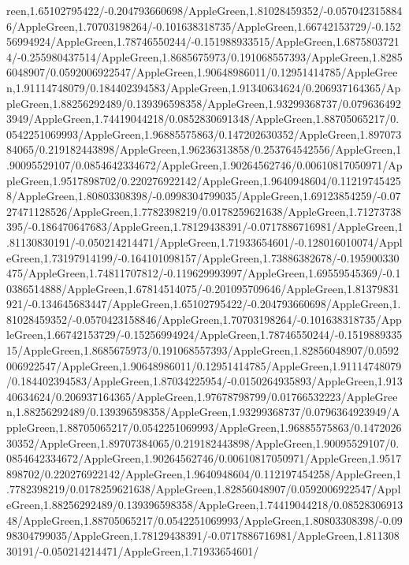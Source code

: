 {\begin{tikzternal}
{reen,1.65102795422/-0.204793660698/AppleGreen,1.81028459352/-0.0570423158846/AppleGreen,1.70703198264/-0.101638318735/AppleGreen,1.66742153729/-0.15256994924/AppleGreen,1.78746550244/-0.151988933515/AppleGreen,1.68758037214/-0.255980437514/AppleGreen,1.8685675973/0.191068557393/AppleGreen,1.82856048907/0.0592006922547/AppleGreen,1.90648986011/0.12951414785/AppleGreen,1.91114748079/0.184402394583/AppleGreen,1.91340634624/0.206937164365/AppleGreen,1.88256292489/0.139396598358/AppleGreen,1.93299368737/0.0796364923949/AppleGreen,1.74419044218/0.0852830691348/AppleGreen,1.88705065217/0.0542251069993/AppleGreen,1.96885575863/0.147202630352/AppleGreen,1.89707384065/0.219182443898/AppleGreen,1.96236313858/0.253764542556/AppleGreen,1.90095529107/0.0854642334672/AppleGreen,1.90264562746/0.00610817050971/AppleGreen,1.9517898702/0.220276922142/AppleGreen,1.9640948604/0.112197454258/AppleGreen,1.80803308398/-0.0998304799035/AppleGreen,1.69123854259/-0.0727471128526/AppleGreen,1.7782398219/0.0178259621638/AppleGreen,1.71273738395/-0.186470647683/AppleGreen,1.78129438391/-0.0717886716981/AppleGreen,1.81130830191/-0.050214214471/AppleGreen,1.71933654601/-0.128016010074/AppleGreen,1.73197914199/-0.164101098157/AppleGreen,1.73886382678/-0.195900330475/AppleGreen,1.74811707812/-0.119629993997/AppleGreen,1.69559545369/-0.10386514888/AppleGreen,1.67814514075/-0.201095709646/AppleGreen,1.81379831921/-0.134645683447/AppleGreen,1.65102795422/-0.204793660698/AppleGreen,1.81028459352/-0.0570423158846/AppleGreen,1.70703198264/-0.101638318735/AppleGreen,1.66742153729/-0.15256994924/AppleGreen,1.78746550244/-0.151988933515/AppleGreen,1.8685675973/0.191068557393/AppleGreen,1.82856048907/0.0592006922547/AppleGreen,1.90648986011/0.12951414785/AppleGreen,1.91114748079/0.184402394583/AppleGreen,1.87034225954/-0.0150264935893/AppleGreen,1.91340634624/0.206937164365/AppleGreen,1.97678798799/0.01766532223/AppleGreen,1.88256292489/0.139396598358/AppleGreen,1.93299368737/0.0796364923949/AppleGreen,1.88705065217/0.0542251069993/AppleGreen,1.96885575863/0.147202630352/AppleGreen,1.89707384065/0.219182443898/AppleGreen,1.90095529107/0.0854642334672/AppleGreen,1.90264562746/0.00610817050971/AppleGreen,1.9517898702/0.220276922142/AppleGreen,1.9640948604/0.112197454258/AppleGreen,1.7782398219/0.0178259621638/AppleGreen,1.82856048907/0.0592006922547/AppleGreen,1.88256292489/0.139396598358/AppleGreen,1.74419044218/0.0852830691348/AppleGreen,1.88705065217/0.0542251069993/AppleGreen,1.80803308398/-0.0998304799035/AppleGreen,1.78129438391/-0.0717886716981/AppleGreen,1.81130830191/-0.050214214471/AppleGreen,1.71933654601/
}
\end{tikzternal}}
